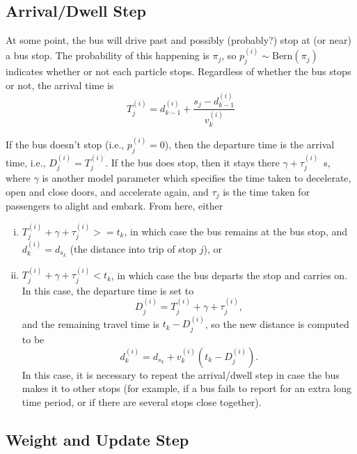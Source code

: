 \documentclass[10pt,a4paper]{article}
\begin{document}
\subsection{Arrival/Dwell Step}


At some point, the bus will drive past and possibly (probably?) stop at (or near) a bus stop.
The probability of this happening is $\pi_j$, so $p_j^{(i)} \sim \mathrm{Bern}(\pi_j)$ 
indicates whether or not each particle stops.
Regardless of whether the bus stops or not, the arrival time is
\begin{equation}
  \label{eq:arrival_time}
  T_j^{(i)} = d_{k-1}^{(i)} + \frac{s_j - d_{k-1}^{(i)}}{v_k^{(i)}}
\end{equation}

If the bus doesn't stop (i.e., $p_j^{(i)} = 0$), then the departure time is the arrival time,
i.e., $D_j^{(i)} = T_j^{(i)}$.
If the bus does stop, then it stays there $\gamma + \tau_j^{(i)}$~s,
where $\gamma$ is another model parameter which specifies the time taken to decelerate, open and close doors,
and accelerate again, and $\tau_j$ is the time taken for passengers to alight and embark.
From here, either
\begin{enumerate}[i.]
\item 
  $T_j^{(i)} + \gamma + \tau_j^{(i)} >= t_k$, in which case the bus remains at the bus stop, 
  and $d_k^{(i)} = d_{s_k}$ (the distance into trip of stop $j$), or
\item 
  $T_j^{(i)} + \gamma + \tau_j^{(i)} < t_k$, in which case the bus departs the stop and carries on.
  In this case, the departure time is set to
  \begin{equation}
    \label{eq:departure_time}
    D_j^{(i)} = T_j^{(i)} + \gamma + \tau_j^{(i)},
  \end{equation}
  and the remaining travel time is $t_k - D_j^{(i)}$, so the new distance is computed to be
  \begin{equation}
    \label{eq:distance_after_stopping}
    d_k^{(i)} = d_{s_k} + v_k^{(i)} \left( t_k - D_j^{(i)} \right).
  \end{equation}
  In this case, it is necessary to repeat the arrival/dwell step in case the bus makes it to other stops
  (for example, if a bus fails to report for an extra long time period, or if there are several stops
  close together).
\end{enumerate}


\subsection{Weight and Update Step}
\end{document}
